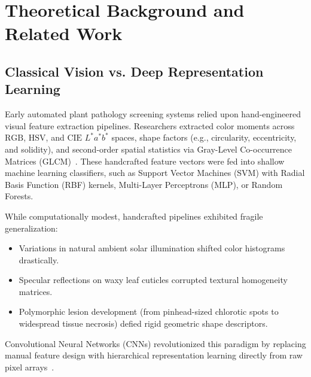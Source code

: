 \documentclass[11pt,a4paper]{article}
\begin{document}
\section{Theoretical Background and Related Work}

\subsection{Classical Vision vs. Deep Representation Learning}
Early automated plant pathology screening systems relied upon hand-engineered visual feature extraction pipelines. Researchers extracted color moments across $\text{RGB}$, $\text{HSV}$, and $\text{CIE } L^*a^*b^*$ spaces, shape factors (e.g., circularity, eccentricity, and solidity), and second-order spatial statistics via Gray-Level Co-occurrence Matrices (GLCM)~\cite{tiwari2020plant, barbedo2019plant}. These handcrafted feature vectors were fed into shallow machine learning classifiers, such as Support Vector Machines (SVM) with Radial Basis Function (RBF) kernels, Multi-Layer Perceptrons (MLP), or Random Forests.

While computationally modest, handcrafted pipelines exhibited fragile generalization:
\begin{itemize}
    \item Variations in natural ambient solar illumination shifted color histograms drastically.
    \item Specular reflections on waxy leaf cuticles corrupted textural homogeneity matrices.
    \item Polymorphic lesion development (from pinhead-sized chlorotic spots to widespread tissue necrosis) defied rigid geometric shape descriptors.
\end{itemize}

Convolutional Neural Networks (CNNs) revolutionized this paradigm by replacing manual feature design with hierarchical representation learning directly from raw pixel arrays~\cite{he2016deep, mohanty2016using}.
\end{document}
